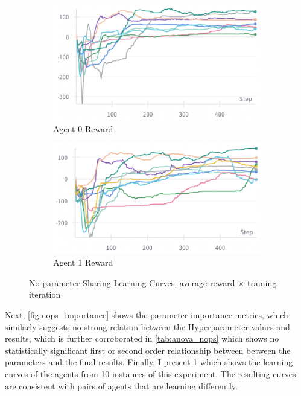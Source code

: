 \documentclass[12pt,letterpaper]{exam}
\begin{document}
\begin{questions}
    \begin{figure}[H]
        \begin{subfigure}{.48\textwidth}
            \centering
            \includegraphics[width=\linewidth]{learn_curve_nops_0.png}
            \caption{Agent 0 Reward}
        \end{subfigure}
        \begin{subfigure}{.48\textwidth}
            \centering
            \includegraphics[width=\linewidth]{learn_curve_nops_1.png}
            \caption{Agent 1 Reward}
        \end{subfigure}
        \caption{No-parameter Sharing Learning Curves, 
            average reward \(\times\) training iteration}
        \label{fig:nops_learn_curves}
    \end{figure}

    Next, \cref{fig:nops_importance} shows the parameter importance metrics,
    which similarly suggests no strong relation between the Hyperparameter
    values and results, which is further corroborated in \cref{tab:anova_nops}
    which shows no statistically significant first or second order
    relationship between between the parameters and the final results.
%
    Finally, I present \cref{fig:nops_learn_curves} which shows the learning 
    curves of the agents from 10 instances of this experiment. 
    The resulting curves are consistent with pairs of agents that are
    learning differently. 




\end{questions}
\end{document}
